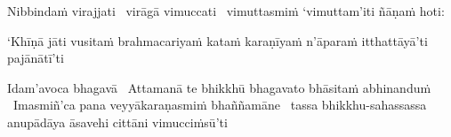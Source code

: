 \begin{pali-hang}
  Nibbindaṁ virajjati \breathmark\ virāgā vimuccati \breathmark\ vimuttasmiṁ `vimuttam'iti ñāṇaṁ hoti:
\end{pali-hang}

\begin{pali-hang}
  `Khīṇā jāti vusitaṁ brahmacariyaṁ kataṁ karaṇīyaṁ n'āparaṁ itthattāyā'ti pajānātī'ti
\end{pali-hang}

\begin{pali-hang}
  Idam'avoca bhagavā \breathmark\ Attamanā te bhikkhū bhagavato bhāsitaṁ abhinanduṁ \breathmark\ Imasmiñ'ca pana veyyākaraṇasmiṁ bhaññamāne \breathmark\ tassa bhikkhu-sahassassa anupādāya āsavehi cittāni vimucciṁsū'ti
\end{pali-hang}

\suttaRef{[SN 35.28]}

